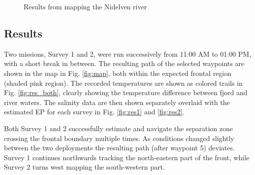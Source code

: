 \documentclass[aoas]{imsart}
\begin{document}
\begin{figure}[!h]
\hspace{0.4cm}
\caption{Results from mapping the Nidelven river} 
\label{fig:results}
\end{figure}

\subsection{Results}

Two missions, Survey 1 and 2, were run successively from 11:00 AM to 01:00 PM, with a short break in between. The resulting path of the selected waypoints are shown in the map in Fig. \ref{fig:map}, both within the expected frontal region (shaded pink region). The recorded temperatures are shown as colored trails in Fig. \ref{fig:res_both}, clearly showing the temperature difference between fjord and river waters. The salinity data are then shown separately overlaid with the estimated EP for each survey in Fig. \ref{fig:res1} and \ref{fig:res2}. 

Both Survey 1 and 2 successfully estimate and navigate the separation zone crossing the frontal boundary multiple times. As conditions changed slightly between the two deployments the resulting path (after waypoint 5) deviates. Survey 1 continues northwards tracking the north-eastern part of the front, while Survey 2 turns west mapping the south-western part. 
\end{document}
